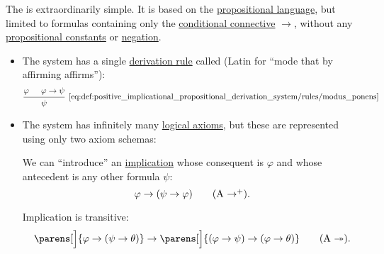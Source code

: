 \begin{definition}\label{def:positive_implicational_propositional_derivation_system}
  The  is extraordinarily simple. It is based on the \hyperref[def:propositional_language]{propositional language}, but limited to formulas containing only the \hyperref[def:propositional_language/connectives/conditional]{conditional connective} \( \rightarrow \), without any \hyperref[def:propositional_language/constants]{propositional constants} or \hyperref[def:propositional_language/negation]{negation}.

  \begin{itemize}
    \item The system has a single \hyperref[def:proof_derivation_system/rules]{derivation rule} called  (Latin for \enquote{mode that by affirming affirms}):
    \begin{equation*}\taglabel[\textrm{MP}]{eq:def:positive_implicational_propositional_derivation_system/rules/modus_ponens}
      \begin{prooftree}
        \hypo{ \varphi}
        \hypo{ \varphi \rightarrow \psi }
        \infer2[\ref{eq:def:positive_implicational_propositional_derivation_system/rules/modus_ponens}]{ \psi }
      \end{prooftree}
    \end{equation*}

    \item The system has infinitely many \hyperref[def:proof_derivation_system/axioms]{logical axioms}, but these are represented using only two axiom schemas:
    \begin{thmenum}
       We can \enquote{introduce} an \hyperref[def:material_implication]{implication} whose consequent is \( \varphi \) and whose antecedent is any other formula \( \psi \):
      \begin{equation}\label{eq:def:positive_implicational_propositional_derivation_system/axioms/imp/intro}
        \varphi \rightarrow (\psi \rightarrow \varphi) \tag{\textrm{A} \( \rightarrow^+ \)}.
      \end{equation}

       Implication is transitive:
      \begin{equation}\label{eq:def:positive_implicational_propositional_derivation_system/axioms/imp/trans}
        \parens[\Big]{ \varphi \rightarrow (\psi \rightarrow \theta) } \rightarrow \parens[\Big]{ (\varphi \rightarrow \psi) \rightarrow (\varphi \rightarrow \theta)} \tag{\textrm{A} \( \twoheadrightarrow \)}.
      \end{equation}
    \end{thmenum}
  \end{itemize}


\end{definition}
